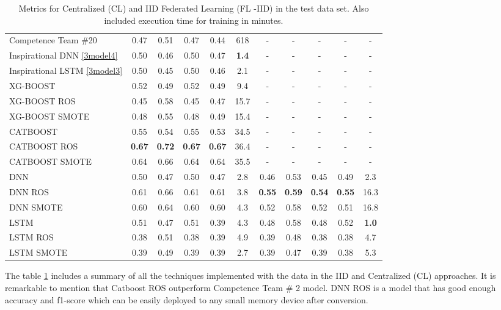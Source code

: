 \begin{table}[ht]
\begin{center}
\begin{adjustbox}{width=\textwidth}
\begin{tabular}{|l|*{5}{c}|*{5}{c}|}
\multicolumn{1}{|l|}{Competence Team \#20 \cite{team_20}} & 0.47 & 0.51 & 0.47 & 0.44 & 618 & - & - & - & - & - \\
\multicolumn{1}{|l|}{Inspirational DNN \ref{3model4}} & 0.50 & 0.46 & 0.50 & 0.47 & \textbf{1.4} & - & - & - & - & -  \\
\multicolumn{1}{|l|}{Inspirational LSTM \ref{3model3}} & 0.50 & 0.45 & 0.50 & 0.46 & 2.1 & - & - & - & - & -  \\
\hline\hline
\multicolumn{1}{|l|}{XG-BOOST} & 0.52 & 0.49 & 0.52 & 0.49 & 9.4 & - & - & - & - & -  \\
\multicolumn{1}{|l|}{XG-BOOST ROS} & 0.45 & 0.58 & 0.45 & 0.47 & 15.7 & - & - & - & - & - \\ 
\multicolumn{1}{|l|}{XG-BOOST SMOTE} & 0.48 & 0.55 & 0.48 & 0.49 & 15.4 & - & - & - & - & -  \\
\multicolumn{1}{|l|}{CATBOOST} & 0.55 & 0.54 & 0.55 & 0.53 & 34.5 & - & - & - & - & - \\
\multicolumn{1}{|l|}{CATBOOST ROS} & \textbf{0.67} & \textbf{0.72} &\textbf{ 0.67 }& \textbf{0.67} & 36.4 & - & - & - & - & -  \\
\multicolumn{1}{|l|}{CATBOOST SMOTE} & 0.64 & 0.66 & 0.64 & 0.64 & 35.5 & - & - & - & - & -  \\
\hline\hline
\multicolumn{1}{|l|}{DNN} & 0.50 & 0.47 & 0.50 & 0.47 & 2.8 & 0.46 & 0.53 & 0.45 & 0.49 & 2.3  \\
\multicolumn{1}{|l|}{DNN ROS} & 0.61 & 0.66 & 0.61 & 0.61 & 3.8 & \textbf{0.55} & \textbf{0.59} & \textbf{0.54} & \textbf{0.55} & 16.3  \\
\multicolumn{1}{|l|}{DNN SMOTE} & 0.60 & 0.64 & 0.60 & 0.60 & 4.3 & 0.52 & 0.58 & 0.52 & 0.51 & 16.8  \\
\hline\hline
\multicolumn{1}{|l|}{LSTM} & 0.51 & 0.47 & 0.51 & 0.39 & 4.3 & 0.48 & 0.58 & 0.48 & 0.52 & \textbf{1.0}  \\ 
\multicolumn{1}{|l|}{LSTM ROS} & 0.38 & 0.51 & 0.38 & 0.39 & 4.9 & 0.39 & 0.48 & 0.38 & 0.38 & 4.7  \\
\multicolumn{1}{|l|}{LSTM SMOTE} & 0.39 & 0.49 & 0.39 & 0.39 & 2.7 & 0.39 & 0.47 & 0.39 & 0.38 & 5.3  \\
\hline
\end{tabular}
\end{adjustbox}
\end{center}
\caption{Metrics for Centralized (CL) and IID Federated Learning (FL -IID) in the test data set. Also included execution time for training in minutes.}
\label{table:metrics_CL_FLIID}
\end{table}

The table \ref{table:metrics_CL_FLIID} includes a summary of all the techniques implemented with the data in the IID and Centralized (CL) approaches. It is remarkable to mention that Catboost ROS outperform Competence Team \# 2 model. DNN ROS is a model that has good enough accuracy and f1-score which can be easily deployed to any small memory device after conversion.  